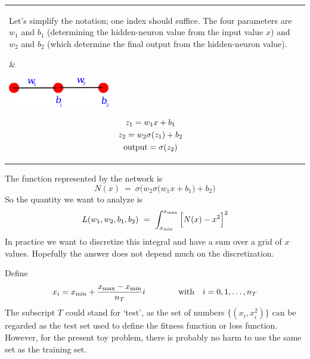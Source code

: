 \documentclass[12pt,a4paper]{article}
\begin{document}
\begin{center}
\begin{tabular}{l|l}
%
\parbox{0.48\textwidth}{ 
%
\raggedright
  
Let's simplify the notation; one index should suffice.  The four parameters are $w_1$ and $b_1$
(determining the hidden-neuron value from the input value $x$) and $w_2$ and $b_2$ (which determine the
final output from the hidden-neuron value).
  


} &   \hspace{-0.01\textwidth}
\parbox{0.42\textwidth}{ \flushleft


\begin{center}
\includegraphics[width=0.35\textwidth]{Images/notation_3node_a_01}
\end{center}

\begin{gather*}
  z_1 = w_1x + b_1
  \\
  z_2 = w_2\sigma(z_1) + b_2
  \\
  {\rm output} = \sigma(z_2)
\end{gather*}


} 
\\
\end{tabular}
\end{center}



The function represented by the network is
\begin{equation}
N(x) ~=~  \sigma\Big( w_2 \sigma\big(w_1x+b_1\big) +b_2 \Big)
\end{equation}
So the quantity we want to analyze is
\begin{equation}
L(w_1,w_2,b_1,b_2) ~=~  \int_{x_{\rm min}}^{x_{\rm max}} \Big[ N(x) -x^2 \Big]^2 
\end{equation}
In practice we want to discretize this integral and have a sum over a grid of $x$ values.  Hopefully
the answer does not depend much on the discretization.  

Define
\[
x_i = x_{\rm min} + \frac{x_{\rm max} - x_{\rm min}}{n_T} i
\qquad \qquad  \text{with} \quad i = 0, 1,\ldots, n_T
\]
The subscript $T$ could stand for `test', as the set of numbers $\{(x_i,x_i^2)\}$ can be regarded as
the test set used to define the fitness function or loss function.  However, for the present
toy problem, there is probably no harm to use the same set as the training set.
\end{document}
